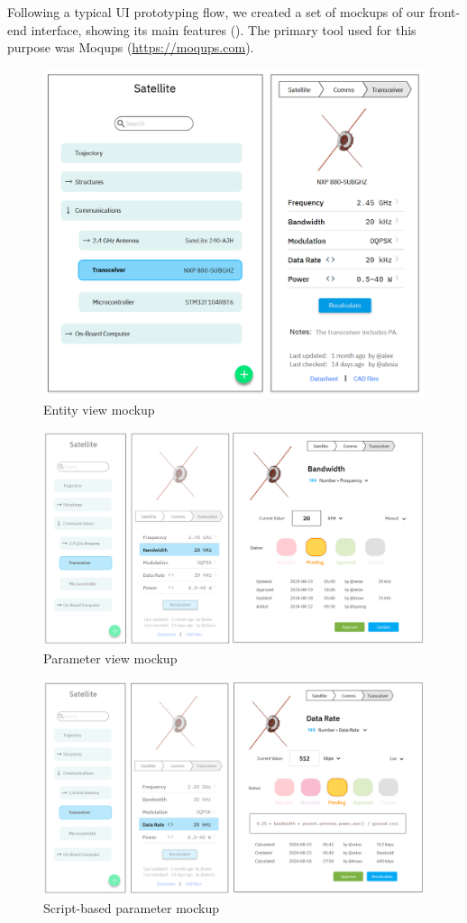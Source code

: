 \documentclass[]{iac}
\begin{document}
Following a typical \acs{UI} prototyping flow, we created a set of mockups of our front-end interface, showing its main features (). The primary tool used for this purpose was Moqups (\url{https://moqups.com}).

\begin{figure}[h]
    \centering
    \includegraphics[width=.7\textwidth]{media/mockup_1.png}
    \caption{Entity view mockup}
    \label{fig:m1}
\end{figure}

\begin{figure}[hp]
    \centering
    \includegraphics[width=\textwidth]{media/mockup_2.png}
    \caption{Parameter view mockup}
    \label{fig:m2}
\end{figure}

\begin{figure}[hp]
    \centering
    \includegraphics[width=\textwidth]{media/mockup_3.png}
    \caption{Script-based parameter mockup}
    \label{fig:m3}
\end{figure}
\end{document}

